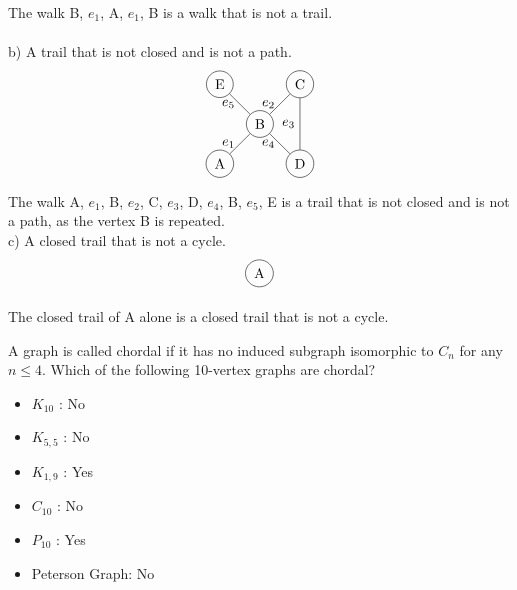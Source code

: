 \documentclass[12pt]{article}
\newenvironment{question}[2][Question]{\begin{trivlist}
\item[\hskip \labelsep {\bfseries #1}\hskip \labelsep {\bfseries #2.}]}{\end{trivlist}}
\begin{document}
The walk B, $e_1$, A, $e_1$, B is a walk that is not a trail. \\ \\
b) A trail that is not closed and is not a path. \\
\begin{align*}
\begin{tikzpicture}
    \node[shape=circle,draw=black] (A) at (0,0) {A};
    \node[shape=circle,draw=black] (B) at (1,1) {B};
    \node[shape=circle,draw=black] (C) at (2,2) {C};
    \node[shape=circle,draw=black] (D) at (2,0) {D};
    \node[shape=circle,draw=black] (E) at (0,2) {E};
    \path [] (A) edge node[left] {$e_1$} (B);
    \path [] (B) edge node[left] {$e_2$} (C);
    \path [] (C) edge node[left] {$e_3$} (D);
    \path [] (D) edge node[left] {$e_4$} (B);
    \path [] (B) edge node[left] {$e_5$} (E);
\end{tikzpicture}
\end{align*}
The walk A, $e_1$, B, $e_2$, C, $e_3$, D, $e_4$, B, $e_5$, E is a trail that is not closed and is not a path, as the vertex B is repeated. \\

c) A closed trail that is not a cycle. \\
\begin{align*}
\begin{tikzpicture}
    \node[shape=circle,draw=black] (A) at (0,0) {A};
\end{tikzpicture}
\end{align*}

The closed trail of A alone is a closed trail that is not a cycle. \\

\begin{question}{7}
A graph is called chordal if it has no induced subgraph isomorphic to $C_{n}$ for any $n \leq 4$. Which of the following 10-vertex graphs are chordal?
\end{question}

\begin{itemize}
\item $K_{10}$ \hspace{3mm}: No
\item $K_{5,5}$ \hspace{2mm}: No
\item $K_{1,9}$ \hspace{2mm}: Yes
\item $C_{10}$ \hspace{3mm}: No
\item $P_{10}$ \hspace{3mm}: Yes
\item Peterson Graph: No
\end{itemize}
\end{document}
